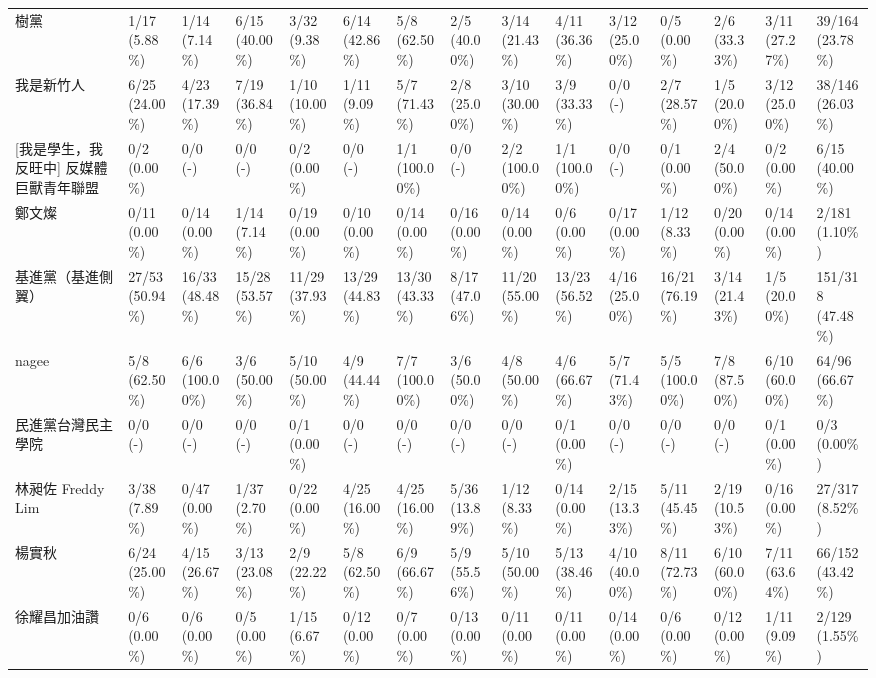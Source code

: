 \documentclass[letterpaper, 10pt, conference]{ieeeconf}   %
\begin{document}
\begin{CJK}{UTF8}{bsmi}
\begin{landscape}
\begin{longtable}[c]{@{}L{2.45cm}L{1.1cm}L{1.1cm}L{1.1cm}L{1.1cm}L{1.1cm}L{1.1cm}L{1.1cm}L{1.1cm}L{1.1cm}L{1.1cm}L{1.1cm}L{1.1cm}L{1.1cm}L{1.1cm}@{}}
樹黨 & 1/17 (5.88\%) & 1/14 (7.14\%) & 6/15 (40.00\%) & 3/32 (9.38\%) & 6/14 (42.86\%) & 5/8 (62.50\%) & 2/5 (40.00\%) & 3/14 (21.43\%) & 4/11 (36.36\%) & 3/12 (25.00\%) & 0/5 (0.00\%) & 2/6 (33.33\%) & 3/11 (27.27\%) & 39/164 (23.78\%) \\
我是新竹人 & 6/25 (24.00\%) & 4/23 (17.39\%) & 7/19 (36.84\%) & 1/10 (10.00\%) & 1/11 (9.09\%) & 5/7 (71.43\%) & 2/8 (25.00\%) & 3/10 (30.00\%) & 3/9 (33.33\%) & 0/0 (-) & 2/7 (28.57\%) & 1/5 (20.00\%) & 3/12 (25.00\%) & 38/146 (26.03\%) \\
{[}我是學生，我反旺中{]} 反媒體巨獸青年聯盟 & 0/2 (0.00\%) & 0/0 (-) & 0/0 (-) & 0/2 (0.00\%) & 0/0 (-) & 1/1 (100.00\%) & 0/0 (-) & 2/2 (100.00\%) & 1/1 (100.00\%) & 0/0 (-) & 0/1 (0.00\%) & 2/4 (50.00\%) & 0/2 (0.00\%) & 6/15 (40.00\%) \\
鄭文燦 & 0/11 (0.00\%) & 0/14 (0.00\%) & 1/14 (7.14\%) & 0/19 (0.00\%) & 0/10 (0.00\%) & 0/14 (0.00\%) & 0/16 (0.00\%) & 0/14 (0.00\%) & 0/6 (0.00\%) & 0/17 (0.00\%) & 1/12 (8.33\%) & 0/20 (0.00\%) & 0/14 (0.00\%) & 2/181 (1.10\%) \\
基進黨（基進側翼） & 27/53 (50.94\%) & 16/33 (48.48\%) & 15/28 (53.57\%) & 11/29 (37.93\%) & 13/29 (44.83\%) & 13/30 (43.33\%) & 8/17 (47.06\%) & 11/20 (55.00\%) & 13/23 (56.52\%) & 4/16 (25.00\%) & 16/21 (76.19\%) & 3/14 (21.43\%) & 1/5 (20.00\%) & 151/318 (47.48\%) \\
nagee & 5/8 (62.50\%) & 6/6 (100.00\%) & 3/6 (50.00\%) & 5/10 (50.00\%) & 4/9 (44.44\%) & 7/7 (100.00\%) & 3/6 (50.00\%) & 4/8 (50.00\%) & 4/6 (66.67\%) & 5/7 (71.43\%) & 5/5 (100.00\%) & 7/8 (87.50\%) & 6/10 (60.00\%) & 64/96 (66.67\%) \\
民進黨台灣民主學院 & 0/0 (-) & 0/0 (-) & 0/0 (-) & 0/1 (0.00\%) & 0/0 (-) & 0/0 (-) & 0/0 (-) & 0/0 (-) & 0/1 (0.00\%) & 0/0 (-) & 0/0 (-) & 0/0 (-) & 0/1 (0.00\%) & 0/3 (0.00\%) \\
林昶佐 Freddy Lim & 3/38 (7.89\%) & 0/47 (0.00\%) & 1/37 (2.70\%) & 0/22 (0.00\%) & 4/25 (16.00\%) & 4/25 (16.00\%) & 5/36 (13.89\%) & 1/12 (8.33\%) & 0/14 (0.00\%) & 2/15 (13.33\%) & 5/11 (45.45\%) & 2/19 (10.53\%) & 0/16 (0.00\%) & 27/317 (8.52\%) \\
楊實秋 & 6/24 (25.00\%) & 4/15 (26.67\%) & 3/13 (23.08\%) & 2/9 (22.22\%) & 5/8 (62.50\%) & 6/9 (66.67\%) & 5/9 (55.56\%) & 5/10 (50.00\%) & 5/13 (38.46\%) & 4/10 (40.00\%) & 8/11 (72.73\%) & 6/10 (60.00\%) & 7/11 (63.64\%) & 66/152 (43.42\%) \\
徐耀昌加油讚 & 0/6 (0.00\%) & 0/6 (0.00\%) & 0/5 (0.00\%) & 1/15 (6.67\%) & 0/12 (0.00\%) & 0/7 (0.00\%) & 0/13 (0.00\%) & 0/11 (0.00\%) & 0/11 (0.00\%) & 0/14 (0.00\%) & 0/6 (0.00\%) & 0/12 (0.00\%) & 1/11 (9.09\%) & 2/129 (1.55\%) \\

\end{longtable}
\end{landscape}
\end{CJK}
\end{document}
